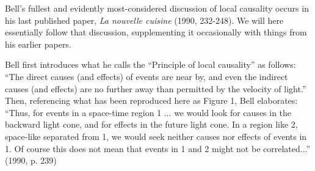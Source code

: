 \documentclass[12pt]{article}
\begin{document}
Bell's fullest and evidently most-considered discussion of local
causality occurs in his last published paper, \emph{La nouvelle
cuisine} (1990, 232-248).  We will here essentially follow that discussion,
supplementing it occasionally with things from his earlier papers.

Bell first introduces what he calls the ``Principle of local
causality'' as follows:  
``The direct causes (and effects) of events are near by, and even the
indirect causes (and effects) are no further away than permitted by
the velocity of light.''
Then, referencing what has been reproduced here as Figure 1, Bell
elaborates:  ``Thus, for events in a space-time region 1 ... we would
look for causes in the backward light cone, and for effects in the
future light cone.  In a region like 2, space-like separated from 1,
we would seek neither causes nor effects of events in 1.  Of course
this does not mean that events in 1 and 2 might not be correlated...''  
(1990, p. 239)
\end{document}
